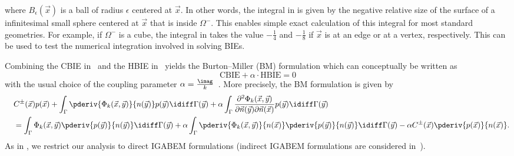 where $B_\epsilon(\vec{x})$ is a ball of radius $\epsilon$ centered at $\vec{x}$. In other words, the integral in  is given by the negative relative size of the surface of a infinitesimal small sphere centered at $\vec{x}$ that is inside $\Omega^-$. This enables simple exact calculation of this integral for most standard geometries. For example, if $\Omega^-$ is a cube, the integral in  takes the value $-\frac14$ and $-\frac{1}{8}$ if $\vec{x}$ is at an edge or at a vertex, respectively. This can be used to test the numerical integration involved in solving BIEs.

Combining the CBIE in~ and the HBIE in~ yields the Burton--Miller (BM) formulation which can conceptually be written as
\begin{equation*}
	\mathrm{CBIE} + \alpha\cdot\mathrm{HBIE} = 0
\end{equation*}
with the usual choice of the coupling parameter $\alpha=\frac{\imag}{k}$~\cite{Zheng2015itb}. More precisely, the BM formulation is given by
\begin{equation}\label{Eq3:BM}
\begin{aligned}
	&C^\pm(\vec{x})p(\vec{x}) + \int_\Gamma \pderiv{\Phi_k(\vec{x},\vec{y})}{n(\vec{y})} p(\vec{y}) \idiff\Gamma(\vec{y}) + \alpha\int_\Gamma \frac{\partial^2\Phi_k(\vec{x},\vec{y})}{\partial\vec{n}(\vec{y})\partial\vec{n}(\vec{x})} p(\vec{y}) \idiff\Gamma(\vec{y})\\
	\quad&=\int_\Gamma \Phi_k(\vec{x},\vec{y}) \pderiv{p(\vec{y})}{n(\vec{y})} \idiff\Gamma(\vec{y})+\alpha\int_\Gamma \pderiv{\Phi_k(\vec{x},\vec{y})}{n(\vec{x})} \pderiv{p(\vec{y})}{n(\vec{y})} \idiff\Gamma(\vec{y}) - \alpha C^\pm(\vec{x})\pderiv{p(\vec{x})}{n(\vec{x})}.
\end{aligned}
\end{equation}
As in \cite{Simpson2014aib}, we restrict our analysis to direct IGABEM formulations (indirect IGABEM formulations are considered in~\cite{Coox2017aii,Dolz2018afi,Wu2020iib}).


